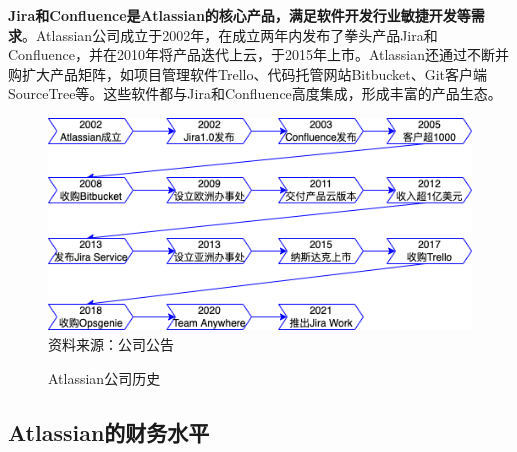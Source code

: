 \textbf{Jira和Confluence是Atlassian的核心产品，满足软件开发行业敏捷开发等需求}。Atlassian公司成立于2002年，在成立两年内发布了拳头产品Jira和Confluence，并在2010年将产品迭代上云，于2015年上市。Atlassian还通过不断并购扩大产品矩阵，如项目管理软件Trello、代码托管网站Bitbucket、Git客户端SourceTree等。这些软件都与Jira和Confluence高度集成，形成丰富的产品生态。
\begin{figure}[H]
    \caption{Atlassian公司历史}
    \includegraphics[width=\linewidth]{img/timeline.drawio.png}
    \footnotesize{资料来源：公司公告}
\end{figure}

\subsection{Atlassian的财务水平}

